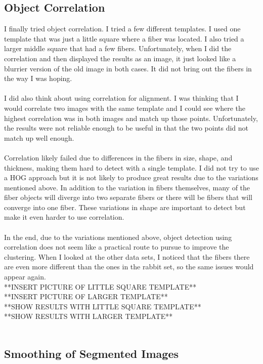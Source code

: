 \documentclass[11pt,psfig]{article}
\begin{document}
\subsection{Object Correlation}
I finally tried object correlation. I tried a few different templates. I used one template that was just a little square where a fiber was located. I also tried a larger middle square that had a few fibers. Unfortunately, when I did the correlation and then displayed the results as an image, it just looked like a blurrier version of the old image in both cases. It did not bring out the fibers in the way I was hoping. \\
\\
I did also think about using correlation for alignment. I was thinking that I would correlate two images with the same template and I could see where the highest correlation was in both images and match up those points. Unfortunately, the results were not reliable enough to be useful in that the two points did not match up well enough. \\
\\
Correlation likely failed due to differences in the fibers in size, shape, and thickness, making them hard to detect with a single template. I did not try to use a HOG approach but it is not likely to produce great results due to the variations mentioned above. In addition to the variation in fibers themselves, many of the fiber objects will diverge into two separate fibers or there will be fibers that will converge into one fiber. These variations in shape are important to detect but make it even harder to use correlation. \\
\\
In the end, due to the variations mentioned above, object detection using correlation does not seem like a practical route to pursue to improve the clustering. When I looked at the other data sets, I noticed that the fibers there are even more different than the ones in the rabbit set, so the same issues would appear again.
\\
**INSERT PICTURE OF LITTLE SQUARE TEMPLATE**\\
**INSERT PICTURE OF LARGER TEMPLATE**\\
**SHOW RESULTS WITH LITTLE SQUARE TEMPLATE**\\
**SHOW RESULTS WITH LARGER TEMPLATE**\\
\\


\subsection{Smoothing of Segmented Images}
\end{document}
